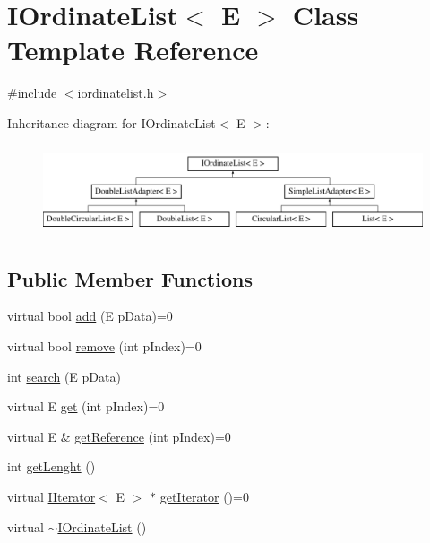 \hypertarget{class_i_ordinate_list}{\section{I\-Ordinate\-List$<$ E $>$ Class Template Reference}
\label{class_i_ordinate_list}
}


{\ttfamily \#include $<$iordinatelist.\-h$>$}

Inheritance diagram for I\-Ordinate\-List$<$ E $>$\-:\begin{figure}[H]
\begin{center}
\leavevmode
\includegraphics[height=2.675159cm]{class_i_ordinate_list}
\end{center}
\end{figure}
\subsection*{Public Member Functions}
\begin{DoxyCompactItemize}
\item 
virtual bool \hyperlink{class_i_ordinate_list_af158c9cda23201b2a17e857ffcdf4cdd}{add} (E p\-Data)=0
\item 
virtual bool \hyperlink{class_i_ordinate_list_a1015be27579a09c4805505ea3e4c4752}{remove} (int p\-Index)=0
\item 
int \hyperlink{class_i_ordinate_list_a596e09a9f1854ca3a570a42bd23dc816}{search} (E p\-Data)
\item 
virtual E \hyperlink{class_i_ordinate_list_aef65b00ca705d1b106d51bff512b2021}{get} (int p\-Index)=0
\item 
virtual E \& \hyperlink{class_i_ordinate_list_a126adb3087d227a7bd47288002c6d48e}{get\-Reference} (int p\-Index)=0
\item 
int \hyperlink{class_i_ordinate_list_acc0d473f2b9b464cc82b5e6cdb887b2a}{get\-Lenght} ()
\item 
virtual \hyperlink{class_i_iterator}{I\-Iterator}$<$ E $>$ $\ast$ \hyperlink{class_i_ordinate_list_aa555ab647394d5bf06bb4f38715bd167}{get\-Iterator} ()=0
\item 
virtual \hyperlink{class_i_ordinate_list_aa8c11bbe9c47cba4163a7fc276adf948}{$\sim$\-I\-Ordinate\-List} ()
\end{DoxyCompactItemize}
